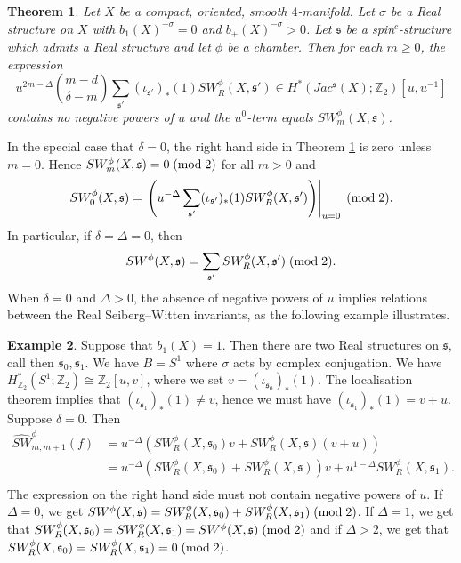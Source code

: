 \documentclass{amsart}
\newtheorem{theorem}{Theorem}[section]
\theoremstyle{definition}
\newtheorem{example}[theorem]{Example}
\theoremstyle{remark}
\numberwithin{equation}{section}
\begin{document}
\begin{theorem}\label{thm:loc2}
Let $X$ be a compact, oriented, smooth $4$-manifold. Let $\sigma$ be a Real structure on $X$ with $b_1(X)^{-\sigma} = 0$ and $b_+(X)^{-\sigma} > 0$. Let $\mathfrak{s}$ be a spin$^c$-structure which admits a Real structure and let $\phi$ be a chamber. Then for each $m \ge 0$, the expression
\[
u^{2m-\Delta} \binom{m-d}{\delta-m} \sum_{\mathfrak{s}'} (\iota_{\mathfrak{s}'})_*(1) SW^\phi_R(X, \mathfrak{s}') \in H^*( Jac^{\mathfrak{s}}(X) ; \mathbb{Z}_2)[u,u^{-1}]
\]
contains no negative powers of $u$ and the $u^0$-term equals $SW^\phi_m(X,\mathfrak{s})$.
\end{theorem}

In the special case that $\delta = 0$, the right hand side in Theorem \ref{thm:loc2} is zero unless $m=0$. Hence $SW^\phi_m(X,\mathfrak{s}) = 0 \; ({\rm mod} \; 2)$ for all $m > 0$ and
\[
SW^\phi_0(X,\mathfrak{s}) = \left.\left( u^{-\Delta} \sum_{\mathfrak{s}'} (\iota_{\mathfrak{s}'})_*(1) SW^\phi_R(X, \mathfrak{s}') \right)\right|_{u=0} \; ({\rm mod} \; 2).
\]
In particular, if $\delta = \Delta = 0$, then
\[
SW^\phi(X,\mathfrak{s}) = \sum_{\mathfrak{s}'} SW^\phi_R(X , \mathfrak{s}') \; ({\rm mod} \; 2).
\]
When $\delta= 0$ and $\Delta > 0$, the absence of negative powers of $u$ implies relations between the Real Seiberg--Witten invariants, as the following example illustrates.

\begin{example}
Suppose that $b_1(X) = 1$. Then there are two Real structures on $\mathfrak{s}$, call then $\mathfrak{s}_0, \mathfrak{s}_1$. We have $B = S^1$ where $\sigma$ acts by complex conjugation. We have $H^*_{\mathbb{Z}_2}( S^1 ; \mathbb{Z}_2) \cong \mathbb{Z}_2[u,v]$, where we set $v = (\iota_{\mathfrak{s}_0})_*(1)$. The localisation theorem implies that $(\iota_{\mathfrak{s}_1})_*(1) \neq v$, hence we must have $(\iota_{\mathfrak{s}_1})_*(1) = v+u$. Suppose $\delta = 0$. Then
\begin{align*}
\widehat{SW}^\phi_{m,m+1}(f) &= u^{-\Delta} ( SW^\phi_R(X,\mathfrak{s}_0)v + SW^\phi_R(X,\mathfrak{s})(v+u) ) \\
&= u^{-\Delta}( SW^\phi_R(X,\mathfrak{s}_0) + SW^\phi_R(X,\mathfrak{s}) )v + u^{1-\Delta} SW^\phi_R(X,\mathfrak{s}_1). \\
\end{align*}
The expression on the right hand side must not contain negative powers of $u$. If $\Delta = 0$, we get $SW^\phi(X,\mathfrak{s}) = SW^\phi_R(X,\mathfrak{s}_0) + SW^\phi_R(X,\mathfrak{s}_1) \; ({\rm mod} \; 2)$. If $\Delta = 1$, we get that $SW^\phi_R(X,\mathfrak{s}_0) = SW^\phi_R(X , \mathfrak{s}_1) = SW^\phi(X,\mathfrak{s}) \; ({\rm mod} \; 2)$ and if $\Delta > 2$, we get that $SW^\phi_R(X,\mathfrak{s}_0) = SW^\phi_R(X, \mathfrak{s}_1) = 0 \; ({\rm mod} \; 2)$.
\end{example}
\end{document}
